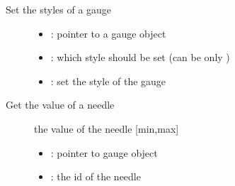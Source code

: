 \documentclass[letterpaper,10pt,english]{sphinxmanual}
\begin{document}
\begin{fulllineitems}
\label{\detokenize{object-types/gauge:_CPPv418lv_gauge_set_styleP8lv_obj_t16lv_gauge_style_tP10lv_style_t}}%
\pysigstartmultiline
{}\label{\detokenize{object-types/gauge:lv__gauge_8h_1a6f77baefbfd82e25b756692e748f1682}}%
\pysigstopmultiline
Set the styles of a gauge \begin{description}
\item[{}] \leavevmode\begin{itemize}
\item {} 
: pointer to a gauge object 

\item {} 
: which style should be set (can be only ) 

\item {} 
: set the style of the gauge 

\end{itemize}

\end{description}


\end{fulllineitems}


\begin{fulllineitems}
\label{\detokenize{object-types/gauge:_CPPv418lv_gauge_get_valuePK8lv_obj_t7uint8_t}}%
\pysigstartmultiline
{}\label{\detokenize{object-types/gauge:lv__gauge_8h_1a34188f078bc6001b021170a89a35f282}}%
\pysigstopmultiline
Get the value of a needle \begin{description}
\item[{}] \leavevmode
the value of the needle {[}min,max{]} 

\item[{}] \leavevmode\begin{itemize}
\item {} 
: pointer to gauge object 

\item {} 
: the id of the needle 

\end{itemize}

\end{description}


\end{fulllineitems}
\end{document}
